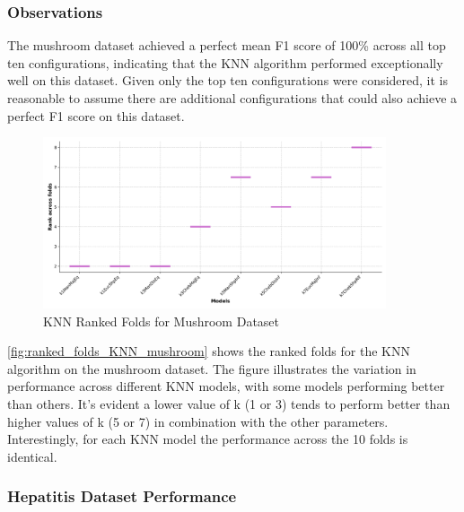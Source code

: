 \subsubsection*{Observations}
The mushroom dataset achieved a perfect mean F1 score of 100\% across all top ten configurations,
indicating that the KNN algorithm performed exceptionally well on this dataset.
Given only the top ten configurations were considered, it is reasonable to assume there are additional
configurations that could also achieve a perfect F1 score on this dataset.

\begin{figure}
    \centering
    \includegraphics[width=0.9\textwidth]{figures/ranked_folds_KNN_mushroom.png}
    \caption{KNN Ranked Folds for Mushroom Dataset}
    \label{fig:ranked_folds_KNN_mushroom}
\end{figure}

\autoref{fig:ranked_folds_KNN_mushroom} shows the ranked folds for the KNN algorithm on the mushroom dataset.
The figure illustrates the variation in performance across different KNN models, with some models performing 
better than others. It's evident a lower value of k (1 or 3) tends to perform better than higher values of k (5 or 7)
in combination with the other parameters. 
Interestingly, for each KNN model the performance across the 10 folds is identical.

\subsubsection{Hepatitis Dataset Performance}

